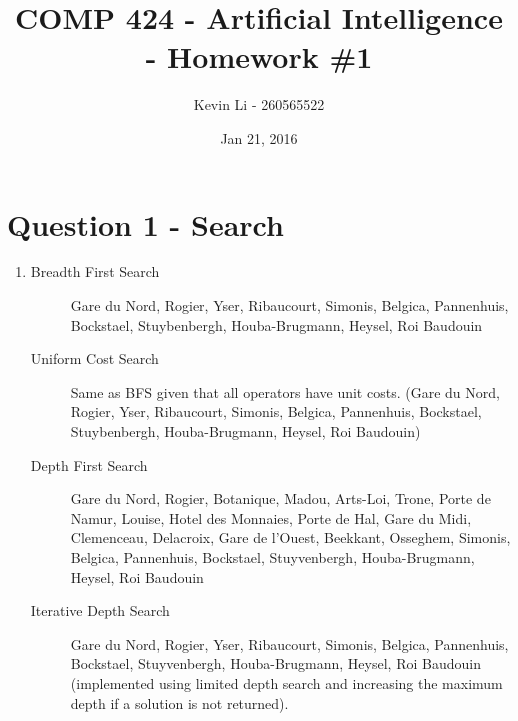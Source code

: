 \documentclass{article}
\title{COMP 424 - Artificial Intelligence - Homework \#1}
\author{Kevin Li - 260565522}
\date{Jan 21, 2016}
\begin{document}
\maketitle
\newpage

\section{Question 1 - Search}
\begin{enumerate}
\item %
    \begin{description}
        \item[Breadth First Search] Gare du Nord, Rogier, Yser,
            Ribaucourt, Simonis, Belgica, Pannenhuis, Bockstael,
            Stuybenbergh, Houba-Brugmann, Heysel, Roi Baudouin

        \item[Uniform Cost Search] Same as BFS given that all
            operators have unit costs. (Gare du Nord, Rogier, Yser, Ribaucourt, Simonis, Belgica, Pannenhuis, Bockstael, Stuybenbergh, Houba-Brugmann, Heysel, Roi Baudouin)

        \item[Depth First Search] Gare du Nord, Rogier, Botanique, Madou, Arts-Loi, Trone, Porte de Namur, Louise, Hotel des Monnaies, Porte de Hal, Gare du Midi, Clemenceau, Delacroix, Gare de l'Ouest, Beekkant, Osseghem, Simonis, Belgica, Pannenhuis, Bockstael, Stuyvenbergh, Houba-Brugmann, Heysel, Roi Baudouin

        \item[Iterative Depth Search] Gare du Nord, Rogier, Yser, Ribaucourt, Simonis, Belgica, Pannenhuis, Bockstael, Stuyvenbergh, Houba-Brugmann, Heysel, Roi Baudouin (implemented using limited depth search and increasing the maximum depth if a solution is not returned).
    \end{description}


\end{enumerate}
\end{document}
